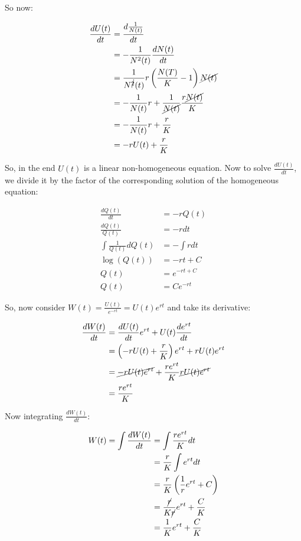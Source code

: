   So now:

  \begin{align*}
    \frac{dU(t)}{dt} &= \frac{d\frac{1}{N(t)}}{dt}\\
                     &= -\frac{1}{N^2(t)}\frac{dN(t)}{dt}\\
                     &= \frac{1}{N^{\cancel{2}}(t)}r\left(\frac{N(T)}{K}-1\right)\cancel{N(t)}\\
                     &= -\frac{1}{N(t)}r + \frac{1}{\cancel{N(t)}}\frac{r\cancel{N(t)}}{K}\\
                     &= -\frac{1}{N(t)}r + \frac{r}{K}\\
                     &= -rU(t)+\frac{r}{K}
  \end{align*}

  So, in the end $U(t)$ is a linear non-homogeneous equation.
  Now to solve $\frac{dU(t)}{dt}$, we divide it by the factor of the corresponding solution of the homogeneous equation:

  \begin{align*}
    \frac{dQ(t)}{dt} &= -rQ(t)\\
    \frac{dQ(t)}{Q(t)} & = -rdt\\
    \int\frac{1}{Q(t)}dQ(t) &= -\int rdt\\
    \log(Q(t)) &= -rt + C\\
    Q(t) &= e^{-rt + C}\\
    Q(t) &= Ce^{-rt}
  \end{align*}

  So, now consider $W(t) = \frac{U(t)}{e^{-rt}} = U(t)e^{rt}$ and take its derivative:

  \begin{align*}
    \frac{dW(t)}{dt} &= \frac{dU(t)}{dt}e^{rt} + U(t)\frac{de^{rt}}{dt}\\
                     &= \left(-rU(t) + \frac{r}{K}\right)e^{rt} + rU(t)e^{rt}\\
                     &= \cancel{-rU(t)e^{rt}} + \frac{re^{rt}}{K} \cancel{ rU(t)e^{rt}}\\
                     &= \frac{re^{rt}}{K}
  \end{align*}

  Now integrating $\frac{dW(t)}{dt}$:

  \begin{align*}
    W(t) = \int\frac{dW(t)}{dt} &= \int\frac{re^{rt}}{K}dt\\
                                &=\frac{r}{K}\int e^{rt}dt\\
                                &= \frac{r}{K}\left(\frac{1}{r}e^{rt} + C\right)\\
                                &= \frac{\cancel{r}}{K\cancel{r}}e^{rt} + \frac{C}{K}\\
                                &= \frac{1}{K}e^{rt} + \frac{C}{K}
  \end{align*}

